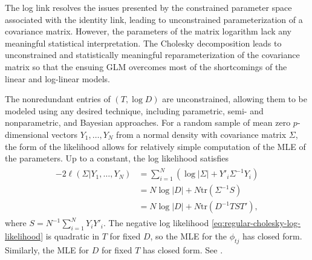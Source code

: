 The log link resolves the issues presented by the constrained parameter space associated with the identity link, leading to unconstrained parameterization of a covariance matrix. However, the parameters of the matrix logarithm lack any meaningful statistical interpretation. %
The Cholesky decomposition leads to unconstrained and statistically meaningful reparameterization of the covariance matrix so that the ensuing GLM overcomes most of the shortcomings of the linear and log-linear models.  %

%
The nonredundant entries of $\left(T, \log D\right)$ are unconstrained, allowing them to be modeled using any desired technique, including parametric, semi- and nonparametric, and Bayesian approaches. For a random sample of mean zero $p$-dimensional vectors $Y_1,\dots , Y_N$  from a normal density with covariance matrix $\Sigma$, the form of the likelihood allows for relatively simple computation of the MLE of the parameters. Up to a constant, the log likelihood satisfies
\begin{align}
\begin{split} \label{eq:regular-cholesky-log-likelihood}
-2\ell\left(\Sigma \vert Y_1,\dots, Y_N\right) &= \sum_{i = 1}^N \left( \log \vert \Sigma \vert  + Y'_i \Sigma^{-1}Y_i\right) \\
&= N \log \vert D \vert + N \mbox{tr}\left(\Sigma^{-1}S\right) \\
& = N \log \vert D \vert + N \mbox{tr}\left(D^{-1}TST'\right), 
\end{split}
\end{align}
\noindent
where $S = N^{-1}\sum_{i=1}^N Y_iY'_i$. The negative log likelihood \eqref{eq:regular-cholesky-log-likelihood} is quadratic in $T$ for fixed $D$, so the MLE for the $\phi_{tj}$ has closed form. Similarly, the MLE for $D$ for fixed $T$ has closed form. See \cite{pourahmadi2000maximum}. 

